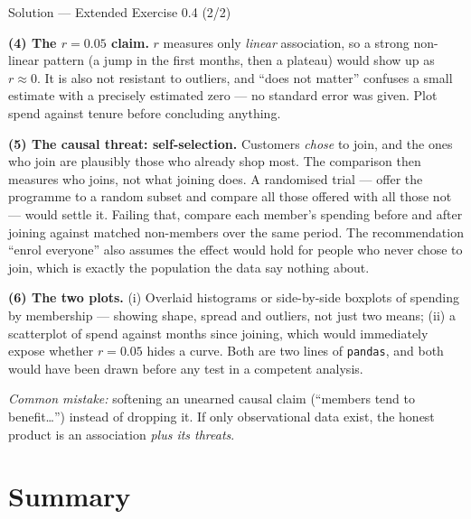 \documentclass[aspectratio=169,11pt]{beamer}
\begin{document}
\begin{frame}{Solution --- Extended Exercise 0.4 (2/2)}
  \begin{solutionbox}
    \scriptsize
    \textbf{(4) The $r = 0.05$ claim.} $r$ measures only \emph{linear}
    association, so a strong non-linear pattern (a jump in the first months,
    then a plateau) would show up as $r \approx 0$. It is also not resistant
    to outliers, and ``does not matter'' confuses a small estimate with a
    precisely estimated zero --- no standard error was given. Plot spend
    against tenure before concluding anything.

    \textbf{(5) The causal threat: self-selection.} Customers \emph{chose} to
    join, and the ones who join are plausibly those who already shop most.
    The comparison then measures who joins, not what joining does. A
    randomised trial --- offer the programme to a random subset and compare
    all those offered with all those not --- would settle it. Failing that,
    compare each member's spending before and after joining against matched
    non-members over the same period. The recommendation ``enrol everyone''
    also assumes the effect would hold for people who never chose to join,
    which is exactly the population the data say nothing about.

    \textbf{(6) The two plots.} (i) Overlaid histograms or side-by-side
    boxplots of spending by membership --- showing shape, spread and outliers,
    not just two means; (ii) a scatterplot of spend against months since
    joining, which would immediately expose whether $r = 0.05$ hides a curve.
    Both are two lines of \texttt{pandas}, and both would have been drawn
    before any test in a competent analysis.

    \smallskip
    \textit{Common mistake:} softening an unearned causal claim (``members
    tend to benefit\dots'') instead of dropping it. If only observational
    data exist, the honest product is an association \emph{plus its threats}.
  \end{solutionbox}
\end{frame}


\section{Summary}
\end{document}
